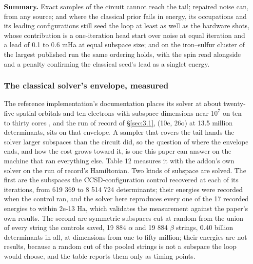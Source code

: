 \documentclass[11pt]{article}
\begin{document}
\textbf{Summary.} Exact samples of the circuit cannot reach the tail; repaired noise can, from any source; and where the classical prior fails in energy, its occupations and its leading configurations still seed the loop at least as well as the hardware shots, whose contribution is a one-iteration head start over noise at equal iteration and a lead of 0.1 to 0.6 mHa at equal subspace size; and on the iron--sulfur cluster of the largest published run the same ordering holds, with the spin read alongside and a penalty confirming the classical seed's lead as a singlet energy.

\subsubsection{The classical solver's envelope, measured}\label{sec:3.6.4}


The reference implementation's documentation places its solver at about twenty-five spatial orbitals and ten electrons with subspace dimensions near 1$0^{7}$ on ten to thirty cores \cite{SQDaddonDocs}, and the run of record of \S\ref{sec:3.1}, (10e, 26o) at 13.5 million determinants, sits on that envelope. A sampler that covers the tail hands the solver larger subspaces than the circuit did, so the question of where the envelope ends, and how the cost grows toward it, is one this paper can answer on the machine that ran everything else. Table 12 measures it with the addon's own solver on the run of record's Hamiltonian. Two kinds of subspace are solved. The first are the subspaces the CCSD-configuration control recovered at each of its iterations, from 619 369 to 8 514 724 determinants; their energies were recorded when the control ran, and the solver here reproduces every one of the 17 recorded energies to within 2e-13 Ha, which validates the measurement against the paper's own results. The second are symmetric subspaces cut at random from the union of every string the controls saved, 19 884 $\alpha$ and 19 884 $\beta$ strings, 0.40 billion determinants in all, at dimensions from one to fifty million; their energies are not results, because a random cut of the pooled strings is not a subspace the loop would choose, and the table reports them only as timing points.
\end{document}
